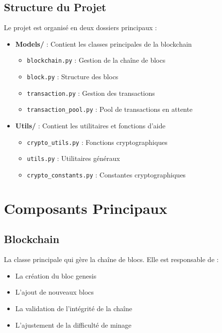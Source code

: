 \documentclass[french]{article}
\begin{document}
\subsection{Structure du Projet}
Le projet est organisé en deux dossiers principaux :
\begin{itemize}
    \item \textbf{Models/} : Contient les classes principales de la blockchain
    \begin{itemize}
        \item \texttt{blockchain.py} : Gestion de la chaîne de blocs
        \item \texttt{block.py} : Structure des blocs
        \item \texttt{transaction.py} : Gestion des transactions
        \item \texttt{transaction\_pool.py} : Pool de transactions en attente
    \end{itemize}
    \item \textbf{Utils/} : Contient les utilitaires et fonctions d'aide
    \begin{itemize}
        \item \texttt{crypto\_utils.py} : Fonctions cryptographiques
        \item \texttt{utils.py} : Utilitaires généraux
        \item \texttt{crypto\_constants.py} : Constantes cryptographiques
    \end{itemize}
\end{itemize}

\section{Composants Principaux}

\subsection{Blockchain}
La classe principale qui gère la chaîne de blocs. Elle est responsable de :
\begin{itemize}
    \item La création du bloc genesis
    \item L'ajout de nouveaux blocs
    \item La validation de l'intégrité de la chaîne
    \item L'ajustement de la difficulté de minage
\end{itemize}
\end{document}
